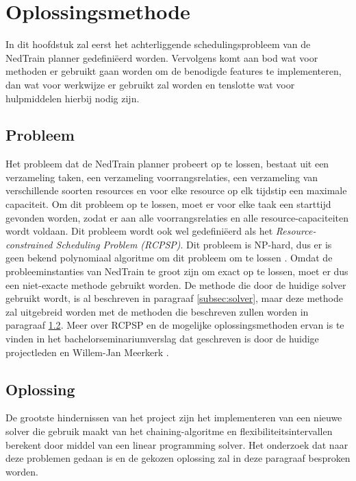 \section{Oplossingsmethode}
In dit hoofdstuk zal eerst het achterliggende schedulingsprobleem van de NedTrain planner gedefini\"eerd worden. 
Vervolgens komt aan bod wat voor methoden er gebruikt gaan worden om de benodigde features te implementeren, dan wat voor werkwijze er gebruikt zal worden en tenslotte wat voor hulpmiddelen hierbij nodig zijn.

\subsection{Probleem}
\label{subsec:probleem}
Het probleem dat de NedTrain planner probeert op te lossen, bestaat uit een verzameling taken, een verzameling voorrangsrelaties, een verzameling van verschillende soorten resources en voor elke resource op elk tijdstip een maximale capaciteit. Om dit probleem op te lossen, moet er voor elke taak een starttijd gevonden worden, zodat er aan alle voorrangsrelaties en alle resource-capaciteiten wordt voldaan.
Dit probleem wordt ook wel gedefini\"eerd als het \emph{Resource-constrained Scheduling Problem (RCPSP)}\cite{seminarium2014}. Dit probleem is NP-hard, dus er is geen bekend polynomiaal algoritme om dit probleem om te lossen \cite{blazewicz1983scheduling}. Omdat de probleeminstanties van NedTrain te groot zijn om exact op te lossen, moet er dus een niet-exacte methode gebruikt worden. De methode die door de huidige solver gebruikt wordt, is al beschreven in paragraaf \ref{subsec:solver}, maar deze methode zal uitgebreid worden met de methoden die beschreven zullen worden in paragraaf \ref{subsec:oplossing}.
Meer over RCPSP en de mogelijke oplossingsmethoden ervan is te vinden in het bachelorseminariumverslag dat geschreven is door de huidige projectleden en Willem-Jan Meerkerk \cite{seminarium2014}.

\subsection{Oplossing}
\label{subsec:oplossing}
De grootste hindernissen van het project zijn het implementeren van een nieuwe solver die gebruik maakt van het chaining-algoritme en flexibiliteitsintervallen berekent door middel van een linear programming solver. Het onderzoek dat naar deze problemen gedaan is en de gekozen oplossing zal in deze paragraaf besproken worden.

